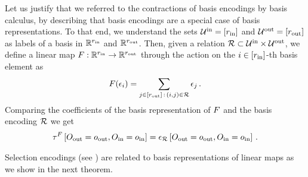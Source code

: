 \begin{example}
    Let us justify that we referred to the contractions of basis encodings by basis calculus, by describing that basis encodings are a special case of basis representations.
    To that end, we understand the sets $\mathcal{U}^{\mathrm{in}}=[r_{\mathrm{in}}]$ and $\mathcal{U}^{\mathrm{out}}=[r_{\mathrm{out}}]$ as labels of a basis in $\mathbb{R}^{r_{\mathrm{in}}}$ and $\mathbb{R}^{r_{\mathrm{out}}}$.
    Then, given a relation $\mathcal{R} \subset \mathcal{U}^{\mathrm{in}} \times \mathcal{U}^{\mathrm{out}}$, we define a linear map $F : \mathbb{R}^{r_{\mathrm{in}}} \rightarrow \mathbb{R}^{r_{\mathrm{out}}}$ through the action on the $i\in[r_{\mathrm{in}}]$-th basis element as
    \begin{align*}
        F(\epsilon_{i}) = \sum_{j\in[r_{\mathrm{out}}]\,:\, (i,j) \in \mathcal{R}} \epsilon_{j} \, .
    \end{align*}
    Comparing the coefficients of the basis representation of $F$ and the basis encoding $\mathcal{R}$ we get
    \begin{align*}
        \tau^{F}\left[O_{\mathrm{out}}=o_{\mathrm{out}},O_{\mathrm{in}}=o_{\mathrm{in}}\right]
        = \epsilon_{\mathcal{R}}\left[O_{\mathrm{out}}=o_{\mathrm{out}},O_{\mathrm{in}}=o_{\mathrm{in}}\right] \, .
    \end{align*}
\end{example}




Selection encodings (see ) are related to basis representations of linear maps as we show in the next theorem.

